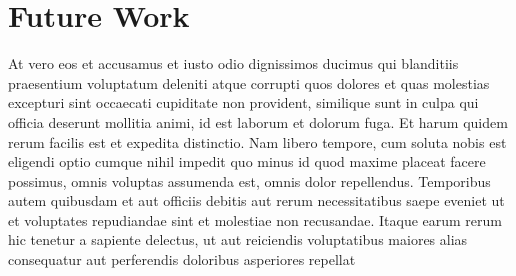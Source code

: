 \documentclass[11pt,]{article}
\begin{document}
\section{Future Work}\label{future-work}

At vero eos et accusamus et iusto odio dignissimos ducimus qui
blanditiis praesentium voluptatum deleniti atque corrupti quos dolores
et quas molestias excepturi sint occaecati cupiditate non provident,
similique sunt in culpa qui officia deserunt mollitia animi, id est
laborum et dolorum fuga. Et harum quidem rerum facilis est et expedita
distinctio. Nam libero tempore, cum soluta nobis est eligendi optio
cumque nihil impedit quo minus id quod maxime placeat facere possimus,
omnis voluptas assumenda est, omnis dolor repellendus. Temporibus autem
quibusdam et aut officiis debitis aut rerum necessitatibus saepe eveniet
ut et voluptates repudiandae sint et molestiae non recusandae. Itaque
earum rerum hic tenetur a sapiente delectus, ut aut reiciendis
voluptatibus maiores alias consequatur aut perferendis doloribus
asperiores repellat

\newpage
\singlespacing 
\end{document}
